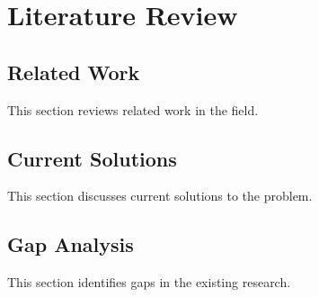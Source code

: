 \chapter{Literature Review}
\label{chap:literature_review}

\section{Related Work}
This section reviews related work in the field.

\section{Current Solutions}
This section discusses current solutions to the problem.

\section{Gap Analysis}
This section identifies gaps in the existing research.
